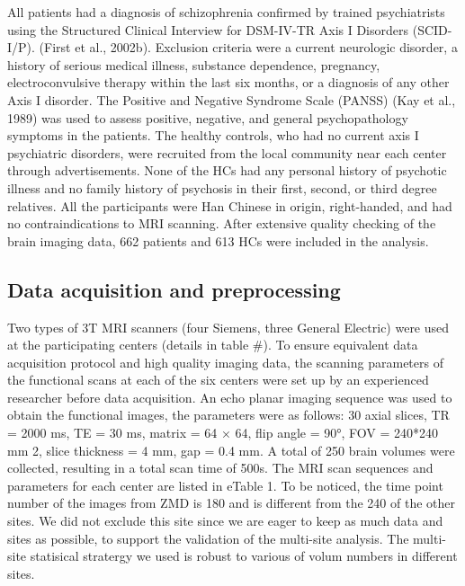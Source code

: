 \documentclass[preprint,authoryear,review,12pt,times]{elsarticle}
\begin{document}
All patients had a diagnosis of schizophrenia confirmed by trained psychiatrists using the Structured Clinical Interview for DSM-IV-TR Axis I Disorders (SCID-I/P). (First et al., 2002b). Exclusion criteria were a current neurologic disorder, a history of serious medical illness, substance dependence, pregnancy, electroconvulsive therapy within the last six months, or a diagnosis of any other Axis I disorder. The Positive and Negative Syndrome Scale (PANSS)  (Kay et al., 1989) was used to assess positive, negative, and general psychopathology symptoms in the patients. The healthy controls, who had no current axis I psychiatric disorders, were recruited from the local community near each center through advertisements. None of the HCs had any personal history of psychotic illness and no family history of psychosis in their first, second, or third degree relatives. All the participants were Han Chinese in origin, right-handed, and had no contraindications to MRI scanning. After extensive quality checking of the brain imaging data, 662 patients and 613 HCs were included in the analysis.
 
 
 
\subsection*{Data acquisition and preprocessing}
 
 
Two types of 3T MRI scanners (four Siemens, three General Electric) were used at the participating centers (details in table \#). To ensure equivalent data acquisition protocol and high quality imaging data, the scanning parameters of the functional scans at each of the six centers were set up by an experienced researcher before data acquisition. An echo planar imaging sequence was used to obtain the functional images, the parameters were as follows: 30 axial slices, TR = 2000 ms, TE = 30 ms, matrix = 64 × 64, flip angle = 90°, FOV = 240*240 mm 2, slice thickness = 4 mm, gap = 0.4 mm. A total of 250 brain volumes were collected, resulting in a total scan time of 500s. The MRI scan sequences and parameters for each center are listed in eTable 1. To be noticed, the time point number of the images from ZMD is 180 and is different from the 240 of the other sites. We did not exclude this site since we are eager to keep as much data and sites as possible, to support the validation of the multi-site analysis. The multi-site statisical stratergy we used is robust to various of volum numbers in different sites.    
\end{document}

